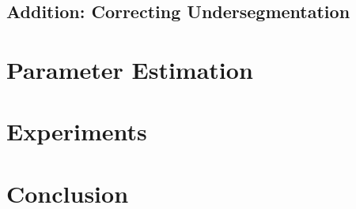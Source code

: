 \documentclass[]{spie}  %
\begin{document}
\subsection{Addition: Correcting Undersegmentation}



\section{Parameter Estimation}
\label{sec:param}

\section{Experiments}
\label{sec:ex}

\section{Conclusion}
\label{sec:conclusion}


\end{document}
